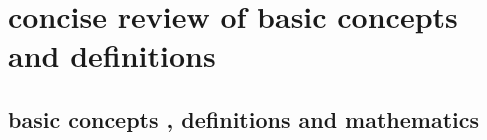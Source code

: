 \ifx\allfiles\undefined
{}  %
\usepackage[dvipsnames]{xcolor}
\usepackage{amsmath}   %
\usepackage{graphicx}
\usetikzlibrary{arrows, calc, decorations.pathmorphing}
\allowdisplaybreaks %
\newcommand{\pa}{\partial}
\newcommand{\mathminus}{\!\!-\!\!} %
\newcommand{\vsup}[1]{\raisebox{-0.1ex}{$\scriptstyle #1$}}
\newcommand{\lsup}[1]{\raisebox{-0.85ex}{$\scriptstyle #1$}}




\else
\fi
\part{concise review of basic concepts and definitions}
\chapter{basic concepts , definitions and mathematics}
